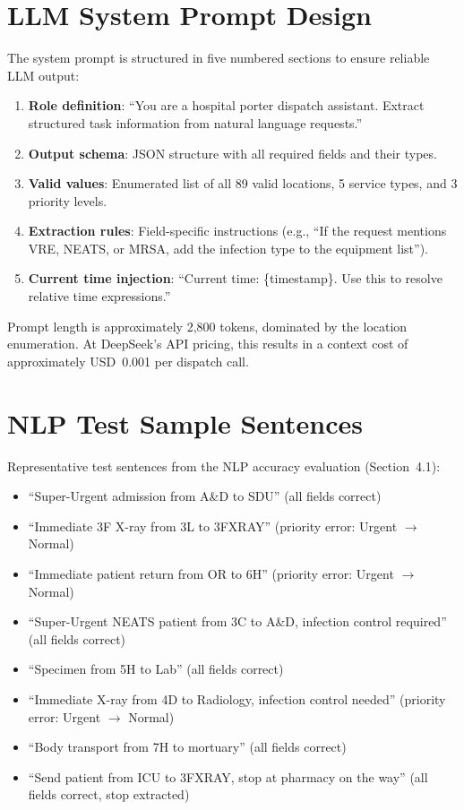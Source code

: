 \documentclass[12pt,a4paper]{article}
\begin{document}
\section{LLM System Prompt Design}

The system prompt is structured in five numbered sections to ensure reliable LLM output:

\begin{enumerate}
  \item \textbf{Role definition}: ``You are a hospital porter dispatch assistant. Extract structured task information from natural language requests.''
  \item \textbf{Output schema}: JSON structure with all required fields and their types.
  \item \textbf{Valid values}: Enumerated list of all 89 valid locations, 5 service types, and 3 priority levels.
  \item \textbf{Extraction rules}: Field-specific instructions (e.g., ``If the request mentions VRE, NEATS, or MRSA, add the infection type to the equipment list'').
  \item \textbf{Current time injection}: ``Current time: \{timestamp\}. Use this to resolve relative time expressions.''
\end{enumerate}

Prompt length is approximately 2,800 tokens, dominated by the location enumeration. At DeepSeek's API pricing, this results in a context cost of approximately USD~0.001 per dispatch call.

\section{NLP Test Sample Sentences}

Representative test sentences from the NLP accuracy evaluation (Section~4.1):

\begin{itemize}
  \item ``Super-Urgent admission from A\&D to SDU'' (all fields correct)
  \item ``Immediate 3F X-ray from 3L to 3FXRAY'' (priority error: Urgent $\to$ Normal)
  \item ``Immediate patient return from OR to 6H'' (priority error: Urgent $\to$ Normal)
  \item ``Super-Urgent NEATS patient from 3C to A\&D, infection control required'' (all fields correct)
  \item ``Specimen from 5H to Lab'' (all fields correct)
  \item ``Immediate X-ray from 4D to Radiology, infection control needed'' (priority error: Urgent $\to$ Normal)
  \item ``Body transport from 7H to mortuary'' (all fields correct)
  \item ``Send patient from ICU to 3FXRAY, stop at pharmacy on the way'' (all fields correct, stop extracted)
\end{itemize}
\end{document}
